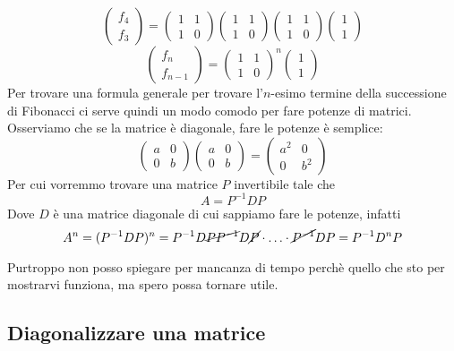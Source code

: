\documentclass{article}     %
\begin{document}
\[\begin{pmatrix} f_4\\f_3 \end{pmatrix} = \begin{pmatrix} 1&1\\1&0 \end{pmatrix}\begin{pmatrix} 1&1\\1&0 \end{pmatrix}\begin{pmatrix} 1&1\\1&0 \end{pmatrix} \begin{pmatrix} 1\\1 \end{pmatrix}\]
\[\begin{pmatrix} f_n\\f_{n -1} \end{pmatrix} = \begin{pmatrix} 1&1\\1&0 \end{pmatrix}^n \begin{pmatrix} 1\\1 \end{pmatrix}\]
Per trovare una formula generale per trovare l'$n$-esimo termine della successione di Fibonacci ci serve quindi un modo comodo per fare potenze di matrici. Osserviamo che se la matrice è diagonale, fare le potenze è semplice:
\[\begin{pmatrix} a&0\\0&b \end{pmatrix}\begin{pmatrix} a&0\\0&b \end{pmatrix} = \begin{pmatrix} a^2&0\\0&b^2 \end{pmatrix} \]
Per cui vorremmo trovare una matrice $P$ invertibile tale che 
\[A = P^{ - 1}DP\]
Dove $D$ è una matrice diagonale di cui sappiamo fare le potenze, infatti
\[A^{n} =(P^{ - 1}DP)^n = P^{ - 1}D\cancel{PP^{ - 1}}D\cancel{P}\cdot \ldots \cdot \cancel{P^{ - 1}}DP = P^{ - 1}D^nP\]

Purtroppo non posso spiegare per mancanza di tempo perchè quello che sto per mostrarvi funziona, ma spero possa tornare utile.
\subsection{Diagonalizzare una matrice}
\end{document}
